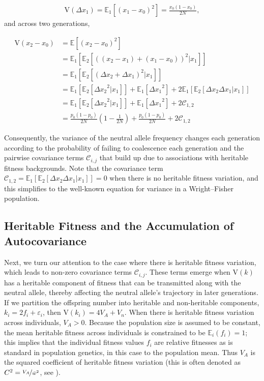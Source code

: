 \documentclass[11pt]{article}
\newcommand{\E}{\mathbb{E}}
\newcommand{\V}{\text{V}}
\begin{document}
\begin{align}
  \V(\Delta x_1) = \E_1\left[(x_1 - x_0)^2\right]= \frac{x_0(1-x_0)}{2N},
\end{align}
%
and across two generations,

\begin{align}
  \label{eq:var_wf}
  \V(x_2 - x_0) &= \E\left[(x_2 - x_0)^2\right] \nonumber \\
          &= \E_1\left[\E_2\left[((x_2-x_1) + (x_1 - x_0))^2 | x_1\right]\right] \nonumber \\
          &= \E_1\left[\E_2\left[(\Delta x_2 + \Delta x_1)^2 | x_1\right]\right] \nonumber \\
          &= \E_1\left[\E_2\left[{\Delta x_2}^2|x_1\right]\right] + \E_1\left[ {\Delta x_1}^2\right] + 2\E_1\left[\E_2[\Delta x_2 \Delta x_1 | x_1]\right] \nonumber \\
          &= \E_1\left[\E_2\left[{\Delta x_2}^2|x_1\right]\right] + \E_1\left[ {\Delta x_1}^2\right] + 2\mathcal{C}_{1,2} \nonumber \\
          &= \frac{p_0(1-p_0)}{2N}\left(1 - \frac{1}{2N}\right) + \frac{p_0(1-p_0)}{2N} + 2\mathcal{C}_{1,2}
\end{align}

Consequently, the variance of the neutral allele frequency changes each
generation according to the probability of failing to coalescence each
generation and the pairwise covariance terms $\mathcal{C}_{i,j}$ that build up
due to associations with heritable fitness backgrounds. Note that the
covariance term $\mathcal{C}_{1,2} = \E_1\left[\E_2[\Delta x_2 \Delta x_1 |
x_1]\right] = 0$ when there is no heritable fitness variation, and this
simplifies to the well-known equation for variance in a Wright--Fisher
population.

\subsection{Heritable Fitness and the Accumulation of Autocovariance}
\label{suppsec:heritable-fitness}

Next, we turn our attention to the case where there is heritable fitness
variation, which leads to non-zero covariance terms $\mathcal{C}_{i,j}$. These
terms emerge when $\V(k)$ has a heritable component of fitness that can be
transmitted along with the neutral allele, thereby affecting the neutral
allele's trajectory in later generations. If we partition the offspring number
into heritable and non-heritable components, $k_i = 2f_i + \varepsilon_i$, then
$\V(k_i) = 4 V_A + V_n$. When there is heritable fitness variation across
individuals, $V_A > 0$. Because the population size is assumed to be constant,
the mean heritable fitness across individuals is constrained to be $\E_i(f_i) =
1$; this implies that the individual fitness values $f_i$ are relative
fitnesses as is standard in population genetics, in this case to the population
mean. Thus $V_A$ is the squared coefficient of heritable fitness variation
(this is often denoted as $C^2 = \nicefrac{V_A}{\bar{w}^2}$, see
\cite{Crow1958-pc,Charlesworth1987-ab,Houle1992-ur}).
\end{document}
